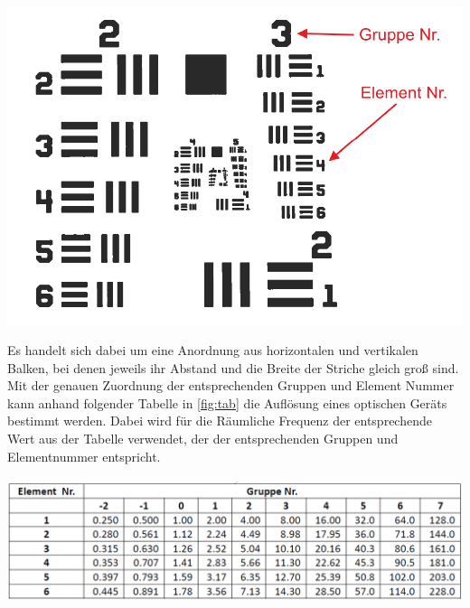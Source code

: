 \documentclass[11pt,ngerman]{scrartcl}
\begin{document}
\begin{center}
	\begin{minipage}[t]{0.7\textwidth}
		\includegraphics[width=\textwidth]{objekt}
		\label{fig:objekt}
	\end{minipage}
\end{center}

\noindent Es handelt sich dabei um eine Anordnung aus horizontalen und
vertikalen Balken, bei denen jeweils ihr Abstand und die Breite der Striche
gleich groß sind. Mit der genauen Zuordnung der entsprechenden Gruppen und
Element Nummer kann anhand folgender Tabelle in \autoref{fig:tab} die Auflösung
eines optischen Geräts bestimmt werden. Dabei wird für die Räumliche Frequenz
der entsprechende Wert aus der Tabelle verwendet, der der entsprechenden
Gruppen und Elementnummer entspricht.

\begin{center}
	\begin{minipage}[t]{\textwidth}
		\includegraphics[width=\textwidth]{tabelle}
		\label{fig:tab}
	\end{minipage}
\end{center}
\end{document}
